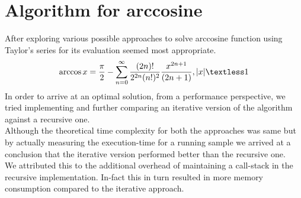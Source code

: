 \documentclass[a4paper,10pt]{report}
\begin{document}
\section{Algorithm for arccosine}
After exploring various possible approaches to solve arccosine function using Taylor's
series for its evaluation seemed most appropriate.\cite{proofwiki}
\begin{equation}
    \arccos x = \frac{\pi}{2}-\sum_{n=0}^\infty\frac{(2n)!}{2^{2n}(n!)^{2}}\frac{x^{2n+1}}{(2n+1)},|x|\textless1\\
\end{equation}
In order to arrive at an optimal solution, from a performance perspective, we tried implementing and further comparing an iterative version of the algorithm against a recursive one.\\
Although the theoretical time complexity for both the approaches was same but by actually measuring the execution-time for a running sample we arrived at a conclusion that the iterative version performed better than the recursive one.\\
We attributed this to the additional overhead of maintaining a call-stack in the recursive implementation. In-fact this in turn resulted in more memory consumption compared to the iterative approach.
\end{document}
